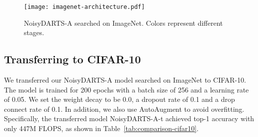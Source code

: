 \documentclass{article}
\begin{document}
\begin{figure}[t]
	\centering
	\texttt{[image: imagenet-architecture.pdf]}
	\caption{NoisyDARTS-A searched on ImageNet. Colors represent different stages.}
	\label{fig:imagenet-architecture}
\end{figure}

\subsection{Transferring to CIFAR-10}
We transferred our NoisyDARTS-A model searched on ImageNet to CIFAR-10. The model is trained for 200 epochs with a batch size of 256 and a learning rate of 0.05. We set the weight decay to be 0.0, a dropout rate of 0.1 and a drop connect rate of 0.1. In addition, we also use AutoAugment to avoid overfitting. Specifically, the transferred model NoisyDARTS-A-t achieved  top-1 accuracy with only 447M FLOPS, as shown in Table~\ref{tab:comparison-cifar10}.
\end{document}

